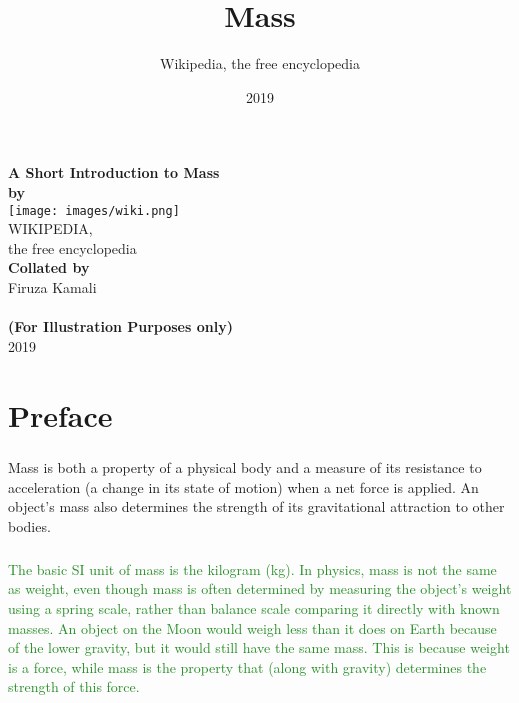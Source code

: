 \documentclass{book}
\title{Mass}
\author{Wikipedia, the free encyclopedia}
\date{2019}
\begin{document}
    \setlength\columnsep{20pt}
    \setlength{\columnseprule}{1pt}

    \begin{titlepage}
        \begin{center}
            \Huge
            \textbf{A Short Introduction to Mass}\\
            \vfill
            \LARGE
            \textbf{by} \\
            \medskip
            \texttt{[image: images/wiki.png]} \\
            \smallskip
            WIKIPEDIA, \\ 
            the free encyclopedia \\
            \vfill
            \textbf{Collated by} \\
            \medskip
            Firuza Kamali\\
            \vfill
            \\
            \vfill
            \textbf{(For Illustration Purposes only)} \\
            \vfill
            2019 \\
        \end{center}
    \end{titlepage}

    \chapter*{Preface}
    \LARGE
    \paragraph{}
    \textcolor{WildStrawberry}{Mass is both a property of a physical body and a measure of its resistance to acceleration (a change in its state of motion) when a net force is applied.\cite{def-mass} An object's mass also determines the strength of its gravitational attraction to other bodies.}
    
    \normalsize
    \paragraph{}
    \textcolor{ForestGreen}{The basic SI unit of mass is the kilogram (kg). In physics, mass is not the same as weight, even though mass is often determined by measuring the object's weight using a spring scale, rather than balance scale comparing it directly with known masses. An object on the Moon would weigh less than it does on Earth because of the lower gravity, but it would still have the same mass. This is because weight is a force, while mass is the property that (along with gravity) determines the strength of this force.}
    
\end{document}
